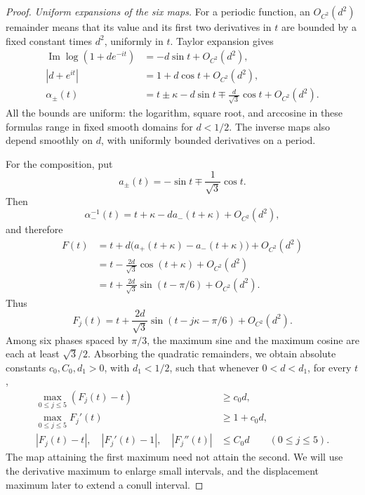 \begin{proof}
\smallskip
\noindent\emph{Uniform expansions of the six maps.}
For a periodic function, an \(O_{C^2}(d^2)\) remainder means that
its value and its first two derivatives in \(t\) are bounded by
a fixed constant times \(d^2\), uniformly in \(t\).  Taylor expansion
gives
\[
 \begin{split}
 \operatorname{Im}\log(1+d e^{-it})
     &=-d\sin t+O_{C^2}(d^2),\\
 |d+e^{it}|&=1+d\cos t+O_{C^2}(d^2),\\
 \alpha_\pm(t)
     &=t\pm\kappa-d\sin t
            \mp\frac d{\sqrt3}\cos t+O_{C^2}(d^2).
 \end{split}
\]
All the bounds are uniform: the logarithm, square root, and
arccosine in these formulas range in fixed smooth domains for
\(d<1/2\).  The inverse maps also depend smoothly on \(d\), with
uniformly bounded derivatives on a period.

For the composition, put
\[
 a_\pm(t)=-\sin t\mp\frac1{\sqrt3}\cos t.
\]
Then
\[
 \alpha_-^{-1}(t)
   =t+\kappa-d a_-(t+\kappa)+O_{C^2}(d^2),
\]
and therefore
\begin{equation}\label{eq:palettes-binary-map-expansion}
 \begin{split}
 F(t)
 &=t+d\bigl(a_+(t+\kappa)-a_-(t+\kappa)\bigr)
                                      +O_{C^2}(d^2)\\
 &=t-\frac{2d}{\sqrt3}\cos(t+\kappa)+O_{C^2}(d^2)\\
 &=t+\frac{2d}{\sqrt3}\sin(t-\pi/6)+O_{C^2}(d^2).
 \end{split}
\end{equation}
Thus
\[
 F_j(t)=t+\frac{2d}{\sqrt3}
             \sin(t-j\kappa-\pi/6)+O_{C^2}(d^2).
\]
Among six phases spaced by \(\pi/3\), the maximum sine and the
maximum cosine are each at least \(\sqrt3/2\).  Absorbing the
quadratic remainders, we obtain absolute constants
\(c_0,C_0,d_1>0\), with \(d_1<1/2\), such that whenever
\(0<d<d_1\), for every \(t\),
\begin{equation}\label{eq:palettes-binary-control}
 \begin{split}
 \max_{0\le j\le5}(F_j(t)-t)&\ge c_0d,\\
 \max_{0\le j\le5}F_j'(t)&\ge1+c_0d,\\
 |F_j(t)-t|,\quad |F_j'(t)-1|,\quad |F_j''(t)|
     &\le C_0d\qquad(0\le j\le5).
 \end{split}
\end{equation}
The map attaining the first maximum need not attain the second.
We will use the derivative maximum to enlarge small intervals,
and the displacement maximum later to extend a conull interval.


\end{proof}
